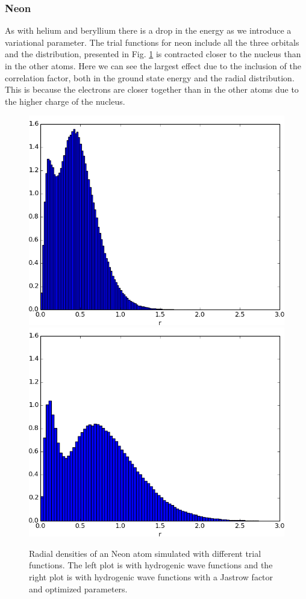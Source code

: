 			
		\subsubsection{Neon}
			As with helium and beryllium there is a drop
                        in the energy as we introduce a variational
                        parameter. The trial functions for neon
                        include all the three orbitals and the
                        distribution, presented in
                        Fig. \ref{fig:oneBodyDensityNeon} is
                        contracted closer to the nucleus than in the
                        other atoms. Here we can see the largest
                        effect due to the inclusion of the correlation
                        factor, both in the ground state energy and
                        the radial distribution. This is because the
                        electrons are closer together than in the
                        other atoms due to the higher charge of the
                        nucleus.
			\begin{figure}
				\centering \includegraphics[width=0.49\linewidth]{content/Results/figures/ChargeDensityNeonSimple}
				\centering \includegraphics[width=0.49\linewidth]{content/Results/figures/ChargeDensityNeon}
				\protect\caption{Radial densities of an Neon atom simulated with different trial functions. The left plot is with hydrogenic wave functions and the right plot is with hydrogenic wave functions with a Jastrow factor and optimized parameters.}
				\label{fig:oneBodyDensityNeon}
			\end{figure}


